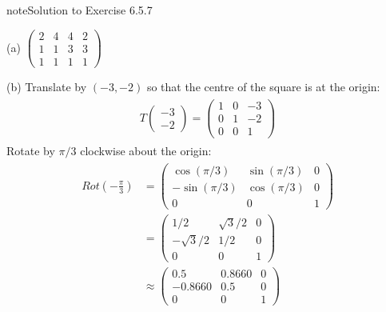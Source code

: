 \documentclass[letterpaper,10pt,english]{jupyterBook}
\begin{document}
\begin{sphinxadmonition}{note}{Solution to Exercise 6.5.7}



\sphinxAtStartPar
(a) \(\begin{pmatrix} 
    2 & 4 & 4 & 2 \\
    1 & 1 & 3 & 3 \\
    1 & 1 & 1 & 1 
\end{pmatrix} \)

\sphinxAtStartPar
(b) Translate by \((-3, -2)\) so that the centre of the square is at the origin:
\begin{equation*}
\begin{split} \begin{align*} 
    T \begin{pmatrix} -3 \\ -2 \end{pmatrix} = 
    \begin{pmatrix}
        1 & 0 & -3 \\
        0 & 1 & -2 \\
        0 & 0 & 1 
    \end{pmatrix}
\end{align*} \end{split}
\end{equation*}
\sphinxAtStartPar
Rotate by \(\pi/3\) clockwise about the origin:
\begin{equation*}
\begin{split} \begin{align*}
    Rot\left(-\frac{\pi}{3}\right) &=
    \begin{pmatrix}
        \cos(\pi/3) & \sin(\pi/3) & 0 \\
        -\sin(\pi/3) & \cos(\pi/3) & 0 \\
        0 & 0 & 1
    \end{pmatrix} \\
    &= \begin{pmatrix}
        1/2 & \sqrt{3}/2 & 0 \\
        -\sqrt{3}/2 & 1/2 & 0 \\
        0 & 0 & 1
    \end{pmatrix} \\
    &\approx \begin{pmatrix}
        0.5 & 0.8660 & 0 \\
        -0.8660 & 0.5 & 0 \\
        0 & 0 & 1
    \end{pmatrix}
\end{align*} \end{split}

\end{equation*}
\end{sphinxadmonition}
\end{document}
